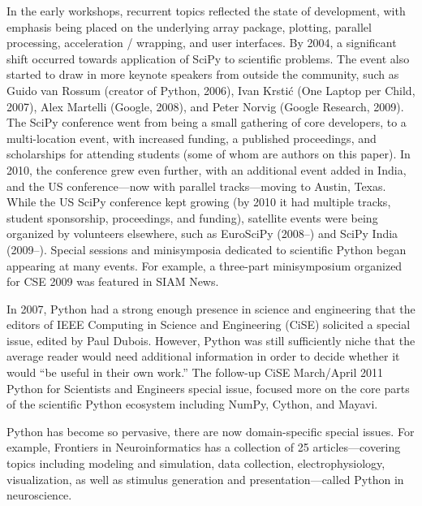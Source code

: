 \documentclass[fleqn,10pt]{wlscirep}
\begin{document}

In the early workshops, recurrent topics reflected the state of development, with
emphasis being placed on the underlying array package, plotting,
parallel processing, acceleration / wrapping, and user interfaces.  By
2004, a significant shift occurred towards application of SciPy to
scientific problems.  The event also started to draw in more keynote
speakers from outside the community, such as Guido van Rossum (creator
of Python, 2006), Ivan Krstić (One Laptop per Child, 2007), Alex
Martelli (Google, 2008), and Peter Norvig (Google Research, 2009).
The SciPy conference went from being a small gathering of
core developers, to a multi-location event, with increased funding, a
published proceedings, and scholarships for attending students (some
of whom are authors on this paper).  In 2010, the conference grew even
further, with an additional event added in India, and the US
conference—now with parallel tracks—moving to Austin, Texas.
While the US SciPy conference kept growing (by 2010 it had multiple
tracks, student sponsorship, proceedings, and funding), satellite
events were being organized by volunteers elsewhere, such as EuroSciPy
(2008–) and SciPy India (2009–).
Special sessions and minisymposia dedicated to scientific Python began
appearing at many events.
For example, a three-part minisymposium organized for CSE 2009 was
featured in SIAM News\cite{siamcse09}.

In 2007, Python had a strong enough presence in science and engineering
that the editors of IEEE Computing in Science and Engineering
(CiSE) solicited a special issue\cite{dubois2007guest}, edited by Paul
Dubois. However, Python was still sufficiently niche that the average reader
would need additional information in order to decide whether it would
``be useful in their own work.''
The follow-up CiSE March/April 2011 Python for Scientists and Engineers
special issue\cite{millman2011python}, focused more on the core parts
of the scientific Python ecosystem\cite{perez2011python} including
NumPy\cite{vanderwalt2011numpy}, Cython\cite{behnel2011cython},
and Mayavi\cite{ramachandran2011mayavi}.

Python has become so pervasive, there are now domain-specific special issues.
For example, Frontiers in Neuroinformatics has a collection of 25 articles---covering
topics including modeling and simulation, data collection, electrophysiology, visualization,
as well as stimulus generation and presentation---called Python in
neuroscience\cite{python-FIN}.
\end{document}
